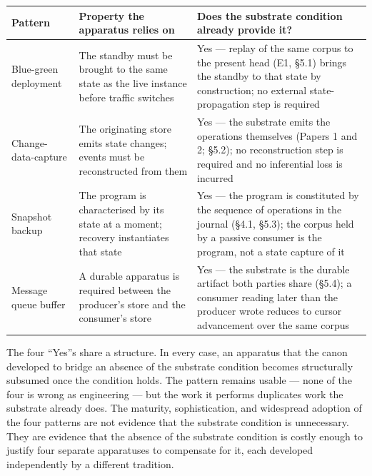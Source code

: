 \documentclass[
]{article}
\newcounter{none} %
\begin{document}
{\def\LTcaptype{none} %
\begin{longtable}[]{@{}
  >{\raggedright\arraybackslash}p{}
  >{\raggedright\arraybackslash}p{}
  >{\raggedright\arraybackslash}p{}@{}}
\toprule\noalign{}
\begin{minipage}[b]{\linewidth}\raggedright
Pattern
\end{minipage} & \begin{minipage}[b]{\linewidth}\raggedright
Property the apparatus relies on
\end{minipage} & \begin{minipage}[b]{\linewidth}\raggedright
Does the substrate condition already provide it?
\end{minipage} \\
\midrule\noalign{}
\endhead
\bottomrule\noalign{}
\endlastfoot
Blue-green deployment & The standby must be brought to the same state as
the live instance before traffic switches & Yes --- replay of the same
corpus to the present head (E1, §5.1) brings the standby to that state
by construction; no external state-propagation step is required \\
Change-data-capture & The originating store emits state changes; events
must be reconstructed from them & Yes --- the substrate emits the
operations themselves (Papers 1 and 2; §5.2); no reconstruction step is
required and no inferential loss is incurred \\
Snapshot backup & The program is characterised by its state at a moment;
recovery instantiates that state & Yes --- the program is constituted by
the sequence of operations in the journal (§4.1, §5.3); the corpus held
by a passive consumer is the program, not a state capture of it \\
Message queue buffer & A durable apparatus is required between the
producer's store and the consumer's store & Yes --- the substrate is the
durable artifact both parties share (§5.4); a consumer reading later
than the producer wrote reduces to cursor advancement over the same
corpus \\
\end{longtable}
}

The four ``Yes''s share a structure. In every case, an apparatus that
the canon developed to bridge an absence of the substrate condition
becomes structurally subsumed once the condition holds. The pattern
remains usable --- none of the four is wrong as engineering --- but the
work it performs duplicates work the substrate already does. The
maturity, sophistication, and widespread adoption of the four patterns
are not evidence that the substrate condition is unnecessary. They are
evidence that the absence of the substrate condition is costly enough to
justify four separate apparatuses to compensate for it, each developed
independently by a different tradition.
\end{document}
